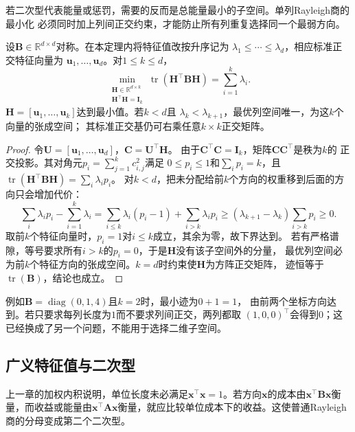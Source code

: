 若二次型代表能量或惩罚，需要的反而是总能量最小的子空间。单列Rayleigh商的最小化
必须同时加上列间正交约束，才能防止所有列重复选择同一个最弱方向。

\begin{theorem}[正交列约束下的迹最小化]
\label{thm:matrix-analysis-trace-minimum}
设$\bm{B}\in\mathbb{R}^{d\times d}$对称。在本定理内将特征值改按升序记为
$\lambda_1\leq\cdots\leq\lambda_d$，相应标准正交特征向量为
$\bm{u}_1,\ldots,\bm{u}_d$。对$1\leq k\leq d$，
\begin{equation}
 \min_{\substack{\bm{H}\in\mathbb{R}^{d\times k}\\
                  \bm{H}^{\top}\bm{H}=\bm{I}_k}}
 \operatorname{tr}(\bm{H}^{\top}\bm{B}\bm{H})
 =\sum_{i=1}^k\lambda_i.
 \label{eq:matrix-analysis-trace-minimum}
\end{equation}
$\bm{H}=[\bm{u}_1,\ldots,\bm{u}_k]$达到最小值。若$k<d$且
$\lambda_k<\lambda_{k+1}$，最优列空间唯一，为这$k$个向量的张成空间；
其标准正交基仍可右乘任意$k\times k$正交矩阵。
\end{theorem}

\begin{proof}
令$\bm{U}=[\bm{u}_1,\ldots,\bm{u}_d]$，$\bm{C}=\bm{U}^{\top}\bm{H}$。
由于$\bm{C}^{\top}\bm{C}=\bm{I}_k$，矩阵$\bm{C}\bm{C}^{\top}$是秩为$k$的
正交投影。其对角元$p_i=\sum_{j=1}^k c_{i,j}^2$满足
$0\leq p_i\leq1$和$\sum_i p_i=k$，且
$\operatorname{tr}(\bm{H}^{\top}\bm{B}\bm{H})=\sum_i\lambda_i p_i$。
对$k<d$，把未分配给前$k$个方向的权重移到后面的方向只会增加代价：
\[
 \sum_i\lambda_i p_i-\sum_{i=1}^k\lambda_i
 =\sum_{i\leq k}\lambda_i(p_i-1)+\sum_{i>k}\lambda_i p_i
 \geq(\lambda_{k+1}-\lambda_k)\sum_{i>k}p_i\geq0.
\]
取前$k$个特征向量时，$p_i=1$对$i\leq k$成立，其余为零，故下界达到。
若有严格谱隙，等号要求所有$i>k$的$p_i=0$，于是$\bm{H}$没有该子空间外的分量，
最优列空间必为前$k$个特征方向的张成空间。$k=d$时约束使$\bm{H}$为方阵正交矩阵，
迹恒等于$\operatorname{tr}(\bm{B})$，结论也成立。
\end{proof}

例如$\bm{B}=\operatorname{diag}(0,1,4)$且$k=2$时，最小迹为$0+1=1$，
由前两个坐标方向达到。若只要求每列长度为$1$而不要求列间正交，两列都取
$(1,0,0)^{\top}$会得到$0$；这已经换成了另一个问题，不能用于选择二维子空间。

\subsection{广义特征值与二次型}

上一章的加权内积说明，单位长度未必满足$\bm{x}^{\top}\bm{x}=1$。若方向$\bm x$的成本由$\bm{x}^{\top}\bm{B}\bm{x}$衡量，而收益或能量由$\bm{x}^{\top}\bm{A}\bm{x}$衡量，就应比较单位成本下的收益。这使普通Rayleigh商的分母变成第二个二次型。

